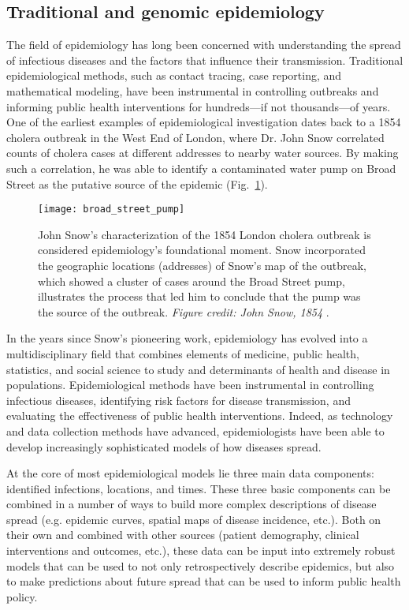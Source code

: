 \subsection{Traditional and genomic epidemiology}\label{sec:tradVsGenEpi}
The field of epidemiology has long been concerned with understanding the spread of infectious diseases and the factors that influence their transmission.
Traditional epidemiological methods, such as contact tracing, case reporting, and mathematical modeling, have been instrumental in controlling outbreaks and informing public health interventions for hundreds---if not thousands---of years.
One of the earliest examples of epidemiological investigation dates back to a 1854 cholera outbreak in the West End of London, where Dr. John Snow correlated counts of cholera cases at different addresses to nearby water sources.
By making such a correlation, he was able to identify a contaminated water pump on Broad Street as the putative source of the epidemic (Fig.~\ref{fig:broadStreetPump}).

\begin{figure}[ht]
  \centering
  \texttt{[image: broad\_street\_pump]}
  \caption[John Snow's map of the 1854 Broad Street cholera outbreak in London]{John Snow's characterization of the 1854 London cholera outbreak is considered epidemiology's foundational moment. Snow incorporated the geographic locations (addresses) of Snow's map of the outbreak, which showed a cluster of cases around the Broad Street pump, illustrates the process that led him to conclude that the pump was the source of the outbreak. \textit{Figure credit: John Snow, 1854} \citep{snow1854mode}.}
  \label{fig:broadStreetPump}
\end{figure}

In the years since Snow's pioneering work, epidemiology has evolved into a multidisciplinary field that combines elements of medicine, public health, statistics, and social science to study and determinants of health and disease in populations.
Epidemiological methods have been instrumental in controlling infectious diseases, identifying risk factors for disease transmission, and evaluating the effectiveness of public health interventions.
Indeed, as technology and data collection methods have advanced, epidemiologists have been able to develop increasingly sophisticated models of how diseases spread.

At the core of most epidemiological models lie three main data components: identified infections, locations, and times.
These three basic components can be combined in a number of ways to build more complex descriptions of disease spread (e.g. epidemic curves, spatial maps of disease incidence, etc.).
Both on their own and combined with other sources (patient demography, clinical interventions and outcomes, etc.), these data can be input into extremely robust models that can be used to not only retrospectively describe epidemics, but also to make predictions about future spread that can be used to inform public health policy.

